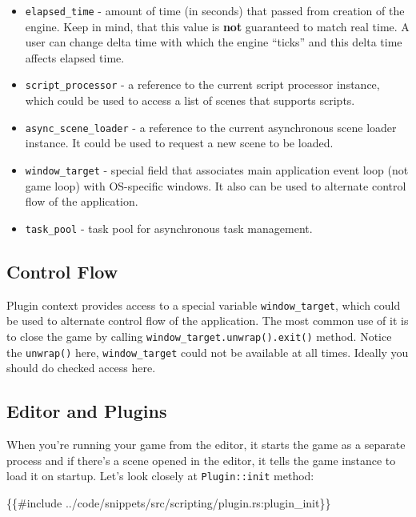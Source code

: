 \documentclass[
]{book}
\newenvironment{Shaded}{\begin{snugshade}}{\end{snugshade}}
\newcommand{\NormalTok}[1]{#1}
\theoremstyle{definition}
\theoremstyle{definition}
\theoremstyle{definition}
\theoremstyle{definition}
\theoremstyle{remark}
\begin{document}
\begin{itemize}
\item
  \texttt{elapsed\_time} - amount of time (in seconds) that passed from creation of the engine. Keep in mind, that this value is \textbf{not} guaranteed to match real time. A user can change delta time with which the engine ``ticks'' and this delta time affects elapsed time.
\item
  \texttt{script\_processor} - a reference to the current script processor instance, which could be used to access a list of scenes that supports scripts.
\item
  \texttt{async\_scene\_loader} - a reference to the current asynchronous scene loader instance. It could be used to request a new scene to be loaded.
\item
  \texttt{window\_target} - special field that associates main application event loop (not game loop) with OS-specific windows. It also can be used to alternate control flow of the application.
\item
  \texttt{task\_pool} - task pool for asynchronous task management.
\end{itemize}

\subsection{Control Flow}\label{control-flow}

Plugin context provides access to a special variable \texttt{window\_target}, which could be used to alternate control flow of the application. The most common use of it is to close the game by calling \texttt{window\_target.unwrap().exit()} method. Notice the \texttt{unwrap()} here, \texttt{window\_target} could not be available at all times. Ideally you should do checked access here.

\subsection{Editor and Plugins}\label{editor-and-plugins}

When you're running your game from the editor, it starts the game as a separate process and if there's a scene opened in the editor, it tells the game instance to load it on startup. Let's look closely at \texttt{Plugin::init} method:

\begin{Shaded}
\begin{Highlighting}[]
\NormalTok{\{\{\#include ../code/snippets/src/scripting/plugin.rs:plugin\_init\}\}}
\end{Highlighting}
\end{Shaded}
\end{document}
